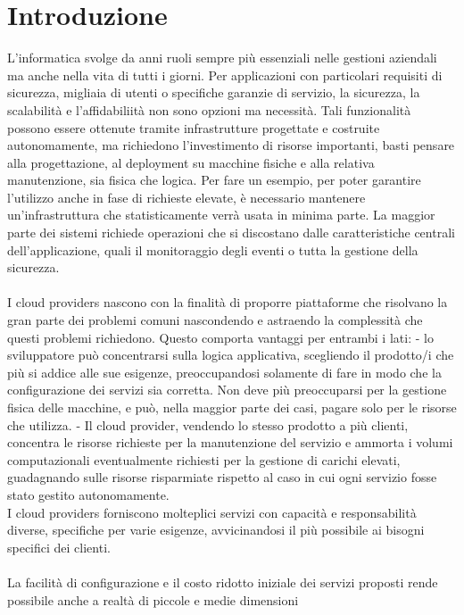 \section{Introduzione}

L'informatica svolge da anni ruoli sempre più essenziali nelle gestioni aziendali ma anche nella vita di tutti i giorni. 
Per applicazioni con particolari requisiti di sicurezza, migliaia di utenti o specifiche garanzie di servizio, la sicurezza, 
la scalabilità e l'affidabiliità non sono opzioni ma necessità. 
Tali funzionalità possono essere ottenute tramite infrastrutture progettate e costruite autonomamente, 
ma richiedono l'investimento di risorse importanti, basti pensare alla progettazione, al deployment su macchine fisiche e alla relativa manutenzione, sia fisica che logica.
Per fare un esempio, per poter garantire l'utilizzo anche in fase di richieste elevate, è necessario mantenere un'infrastruttura che statisticamente verrà usata in minima parte.
La maggior parte dei sistemi richiede operazioni che si discostano dalle caratteristiche centrali dell'applicazione, 
quali il monitoraggio degli eventi o tutta la gestione della sicurezza.\\
\\
I cloud providers nascono con la finalità di proporre piattaforme che risolvano la gran parte dei problemi comuni 
nascondendo e astraendo la complessità che questi problemi richiedono.
Questo comporta vantaggi per entrambi i lati: 
    - lo sviluppatore può concentrarsi sulla logica applicativa, scegliendo il prodotto/i che più si addice alle sue esigenze, 
    preoccupandosi solamente di fare in modo che la configurazione dei servizi sia corretta. 
    Non deve più preoccuparsi per la gestione fisica delle macchine, e può, nella maggior parte dei casi, pagare solo per le risorse che utilizza.
    - Il cloud provider, vendendo lo stesso prodotto a più clienti, concentra le risorse richieste per la manutenzione del servizio
    e ammorta i volumi computazionali eventualmente richiesti per la gestione di carichi elevati, 
    guadagnando sulle risorse risparmiate rispetto al caso in cui ogni servizio fosse stato gestito autonomamente.\\
I cloud providers forniscono molteplici servizi con capacità e responsabilità diverse, specifiche per varie esigenze, 
avvicinandosi il più possibile ai bisogni specifici dei clienti.\\
\\
La facilità di configurazione e il costo ridotto iniziale dei servizi proposti rende possibile anche a realtà di piccole e medie dimensioni 
